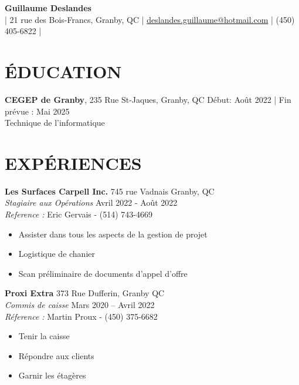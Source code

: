 \documentclass[a4paper,9pt]{extarticle}
\begin{document}
\pagestyle{empty}

\begin{center}
\textbf{\Large Guillaume Deslandes}\\[2pt] %
| 21 rue des Bois-Francs, Granby, QC | \href{mailto:deslandes.guillaume@hotmail.com}{deslandes.guillaume@hotmail.com} | (450) 405-6822 | 
\end{center}

\section*{ÉDUCATION}
\noindent
\textbf{CEGEP de Granby}, 235 Rue St-Jaques, Granby, QC \hfill Début: Août 2022 | Fin prévue :  Mai 2025\\ 
Technique de l'informatique \hfill \\ 
\vspace{8mm}

\section*{EXPÉRIENCES}
\noindent
\textbf{Les Surfaces Carpell Inc.} \hfill 745 rue Vadnais Granby, QC\\
\textit{Stagiaire aux Opérations} \hfill Avril 2022 - Août 2022 \\ 
\textit{Reference : } \hfill Eric Gervais - (514) 743-4669

\begin{itemize}
    \item Assister dans tous les aspects de la gestion de projet
    \item Logistique de chanier
    \item Scan préliminaire de documents d'appel d'offre
\end{itemize}

\noindent
\textbf{Proxi Extra} \hfill 373 Rue Dufferin, Granby QC\\ 
\textit{Commis de caisse} \hfill Mars 2020 – Avril 2022 \\
\textit{Réference : } \hfill Martin Proux - (450) 375-6682 

\begin{itemize}
    \item Tenir la caisse
    \item Répondre aux clients
    \item Garnir les étagères
\end{itemize}
\vspace{8mm}
\end{document}
